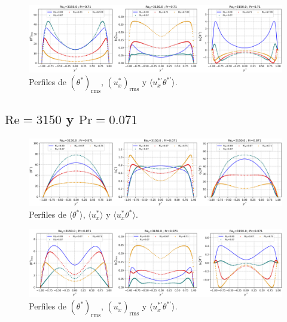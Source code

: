 \begin{figure}[H]
  \centering
    \includegraphics[width=\textwidth]{figures/apendices/developed/Re3150-Pr071_merged_phif-uxf-uxphif.png}
  \caption{Perfiles de  $( \theta^*)_{\text{rms}}$,  $(u^*_x)_{\text{rms}}$ y   $\langle u^{* \prime}_x \theta^{* \prime} \rangle$.}
  \label{fig:profs-Re2100-Pr071}
\end{figure}

\subsection*{$\text{Re}=3150$ y $\text{Pr}=0\text{.}071$}

\begin{figure}[H]
  \centering
    \includegraphics[width=\textwidth]{figures/apendices/developed/Re3150-Pr0071_merged_phi-ux-uxphi.png}
  \caption{Perfiles de  $\langle \theta^* \rangle$,  $\langle u^*_x \rangle$ y   $\langle u^*_x \theta^* \rangle$.}
  \label{fig:profs-Re3150-Pr0071}
\end{figure}

\begin{figure}[H]
  \centering
    \includegraphics[width=\textwidth]{figures/apendices/developed/Re3150-Pr0071_merged_phif-uxf-uxphif.png}
  \caption{Perfiles de  $( \theta^*)_{\text{rms}}$,  $(u^*_x)_{\text{rms}}$ y  $\langle u^{* \prime}_x \theta^{* \prime} \rangle$.}
  \label{fig:profs-Re3150-Pr0071}
\end{figure}

